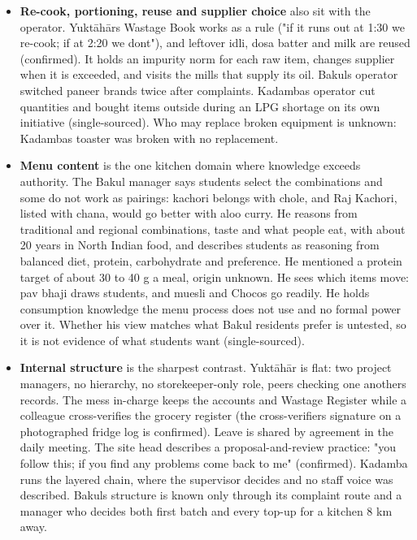 \documentclass[
  10pt,
  table]{article}
\begin{document}
\begin{itemize}
\item
  \textbf{Re-cook, portioning, reuse and supplier choice} also sit with the operator. Yuktāhār\textquotesingle s Wastage Book works as a rule ("if it runs out at 1:30 we re-cook; if at 2:20 we don\textquotesingle t"), and leftover idli, dosa batter and milk are reused (confirmed). It holds an impurity norm for each raw item, changes supplier when it is exceeded, and visits the mills that supply its oil. Bakul\textquotesingle s operator switched paneer brands twice after complaints. Kadamba\textquotesingle s operator cut quantities and bought items outside during an LPG shortage on its own initiative (single-sourced). Who may replace broken equipment is unknown: Kadamba\textquotesingle s toaster was broken with no replacement.
\item
  \textbf{Menu content} is the one kitchen domain where knowledge exceeds authority. The Bakul manager says students select the combinations and some do not work as pairings: kachori belongs with chole, and Raj Kachori, listed with chana, would go better with aloo curry. He reasons from traditional and regional combinations, taste and what people eat, with about 20 years in North Indian food, and describes students as reasoning from balanced diet, protein, carbohydrate and preference. He mentioned a protein target of about 30 to 40 g a meal, origin unknown. He sees which items move: pav bhaji draws students, and muesli and Chocos go readily. He holds consumption knowledge the menu process does not use and no formal power over it. Whether his view matches what Bakul residents prefer is untested, so it is not evidence of what students want (single-sourced).
\item
  \textbf{Internal structure} is the sharpest contrast. Yuktāhār is flat: two project managers, no hierarchy, no storekeeper-only role, peers checking one another\textquotesingle s records. The mess in-charge keeps the accounts and Wastage Register while a colleague cross-verifies the grocery register (the cross-verifier\textquotesingle s signature on a photographed fridge log is confirmed). Leave is shared by agreement in the daily meeting. The site head describes a proposal-and-review practice: "you follow this; if you find any problems come back to me" (confirmed). Kadamba runs the layered chain, where the supervisor decides and no staff voice was described. Bakul\textquotesingle s structure is known only through its complaint route and a manager who decides both first batch and every top-up for a kitchen 8 km away.
\end{itemize}
\end{document}

